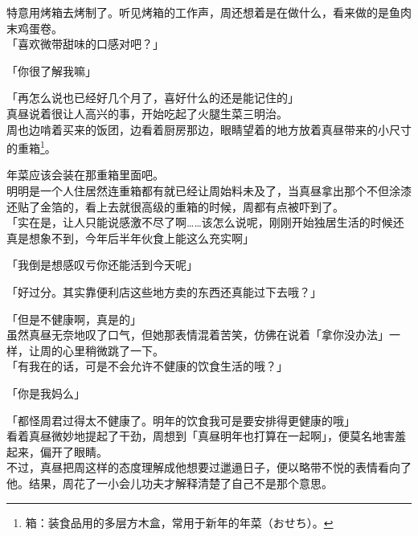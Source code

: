 特意用烤箱去烤制了。听见烤箱的工作声，周还想着是在做什么，看来做的是鱼肉末鸡蛋卷。\\

「喜欢微带甜味的口感对吧？」

「你很了解我嘛」

「再怎么说也已经好几个月了，喜好什么的还是能记住的」\\

真昼说着很让人高兴的事，开始吃起了火腿生菜三明治。\\

周也边啃着买来的饭团，边看着厨房那边，眼睛望着的地方放着真昼带来的小尺寸的重箱\footnote{箱：装食品用的多层方木盒，常用于新年的年菜（{\jpfont おせち}）。}。

年菜应该会装在那重箱里面吧。\\

明明是一个人住居然连重箱都有就已经让周始料未及了，当真昼拿出那个不但涂漆还贴了金箔的，看上去就很高级的重箱的时候，周都有点被吓到了。\\

「实在是，让人只能说感激不尽了啊……该怎么说呢，刚刚开始独居生活的时候还真是想象不到，今年后半年伙食上能这么充实啊」

「我倒是想感叹亏你还能活到今天呢」

「好过分。其实靠便利店这些地方卖的东西还真能过下去哦？」

「但是不健康啊，真是的」\\

虽然真昼无奈地叹了口气，但她那表情混着苦笑，仿佛在说着「拿你没办法」一样，让周的心里稍微跳了一下。\\

「有我在的话，可是不会允许不健康的饮食生活的哦？」

「你是我妈么」

「都怪周君过得太不健康了。明年的饮食我可是要安排得更健康的哦」\\

看着真昼微妙地提起了干劲，周想到「真昼明年也打算在一起啊」，便莫名地害羞起来，偏开了眼睛。\\

不过，真昼把周这样的态度理解成他想要过邋遢日子，便以略带不悦的表情看向了他。结果，周花了一小会儿功夫才解释清楚了自己不是那个意思。
